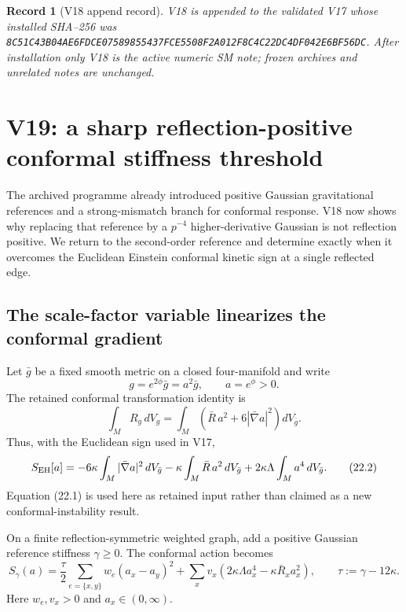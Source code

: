 \documentclass[11pt]{article}
\newtheorem{record}[theorem]{Record}
\theoremstyle{remark}
\begin{document}
\begin{record}[V18 append record]
\label{rec:v19v18}
V18 is appended to the validated V17 whose installed SHA--256 was
\texttt{8C51C43B04AE6FDCE07589855437FCE5508F2A012F8C4C22DC4DF042E6BF56DC}.
After installation only V18 is the active numeric SM note; frozen archives
and unrelated notes are unchanged.
\end{record}




\section{V19: a sharp reflection-positive conformal stiffness threshold}
\label{sec:v19v19}

The archived programme already introduced positive Gaussian gravitational
references and a strong-mismatch branch for conformal response.  V18 now
shows why replacing that reference by a \(p^{-4}\) higher-derivative
Gaussian is not reflection positive.  We return to the second-order
reference and determine exactly when it overcomes the Euclidean
Einstein conformal kinetic sign at a single reflected edge.

\subsection{The scale-factor variable linearizes the conformal gradient}

Let \(\bar g\) be a fixed smooth metric on a closed four-manifold and write
\[
 g=e^{2\phi}\bar g=a^2\bar g,\qquad a=e^\phi>0.
\]
The retained conformal transformation identity is
\[
 \int_M R_g\,dV_g
 =
 \int_M\left(\bar R\,a^2+6|\bar\nabla a|^2\right)dV_{\bar g}.
                                                               \tag{22.1}
\]
Thus, with the Euclidean sign used in V17,
\[
 S_{\rm EH}[a]
 =
 -6\kappa\int_M|\bar\nabla a|^2\,dV_{\bar g}
 -\kappa\int_M\bar R\,a^2\,dV_{\bar g}
 +2\kappa\Lambda\int_Ma^4\,dV_{\bar g}.                        \tag{22.2}
\]
Equation (22.1) is used here as retained input rather than claimed as a
new conformal-instability result.

On a finite reflection-symmetric weighted graph, add a positive Gaussian
reference stiffness \(\gamma\geq0\).  The conformal action becomes
\[
 S_{\gamma}(a)
 =
 \frac{\tau}{2}\sum_{e=\{x,y\}}w_e(a_x-a_y)^2
 +\sum_xv_x\left(2\kappa\Lambda a_x^4-\kappa\bar R_xa_x^2\right),
 \qquad
 \tau:=\gamma-12\kappa.                                       \tag{22.3}
\]
Here \(w_e,v_x>0\) and \(a_x\in(0,\infty)\).
\end{document}
